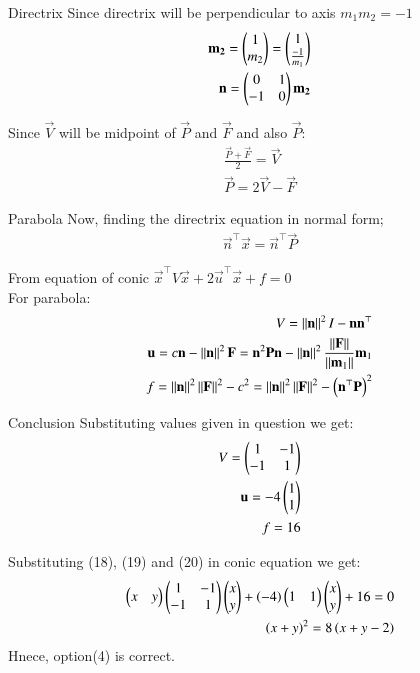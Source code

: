 \documentclass{beamer}
\begin{document}
\begin{frame}{Directrix}
Since directrix will be perpendicular to axis $m_1m_2=-1$
\begin{align}
    \mathbf{m_2} = \begin{pmatrix}1\\m_2\end{pmatrix} = \begin{pmatrix}1\\ \frac{-1}{m_1}\end{pmatrix}\\
    \mathbf{n} = \begin{pmatrix}0&1\\-1&0\end{pmatrix}\mathbf{m_2}
\end{align}

Since $\vec{V}$ will be midpoint of $\vec{P}$ and $\vec{F}$ and also $\vec{P}$:
\begin{align}
    \frac{\vec{P}+\vec{F}}{2} = \vec{V}\\
    \vec{P}=2\vec{V}-\vec{F}
\end{align}
\end{frame}

\begin{frame}{Parabola}
Now, finding the directrix equation in normal form;
\begin{align}
    \vec{n}^\top\vec{x}=\vec{n}^\top\vec{P}
\end{align}

From equation of conic $\vec{x}^\top V\vec{x}+2\vec{u}^\top\vec{x}+f=0$\\
For parabola:
\begin{align}
    V=\left\lVert\mathbf{n}\right\rVert^2I-\mathbf{n}\mathbf{n}^\top\\
    \mathbf{u}=c\mathbf{n}-\left\lVert\mathbf{n}\right\rVert^2\mathbf{F}=\mathbf{n}^2\mathbf{P}\mathbf{n}-\left\lVert\mathbf{n}\right\rVert^2\frac{\left\lVert\mathbf{F}\right\rVert}{\left\lVert\mathbf{m}_1\right\rVert}\mathbf{m}_1\\
    f=\left\lVert\mathbf{n}\right\rVert^2\left\lVert\mathbf{F}\right\rVert^2-c^2=\left\lVert\mathbf{n}\right\rVert^2\left\lVert\mathbf{F}\right\rVert^2-\left(\mathbf{n}^\top\mathbf{P}\right)^2
\end{align}

\end{frame}

\begin{frame}{Conclusion}
Substituting values given in question we get:
\begin{align}
    V=\begin{pmatrix}1&-1\\-1&1\end{pmatrix}\\
    \mathbf{u}=-4\begin{pmatrix}1\\1\end{pmatrix}\\
    f=16
\end{align}

Substituting (18), (19) and (20) in conic equation we get:
\begin{align}
    \begin{pmatrix}x&y\end{pmatrix}\begin{pmatrix}1&-1\\-1&1\end{pmatrix}\begin{pmatrix}x\\y\end{pmatrix}+\left(-4\right)\begin{pmatrix}1&1\end{pmatrix}\begin{pmatrix}x\\y\end{pmatrix}+16=0\\
    \left(x+y\right)^2=8\left(x+y-2\right)
\end{align}
Hnece, option(4) is correct.
\end{frame}
\end{document}
